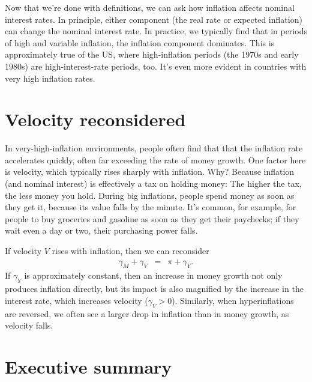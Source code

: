 Now that we're done with definitions, we can ask how inflation
affects nominal interest rates.
In principle, either component (the real rate or expected inflation)
can change the nominal interest rate.
In practice, we typically find that in periods of
high and variable inflation,
the inflation component dominates.
This is approximately true of the US, where high-inflation periods
(the 1970s and early 1980s)
are high-interest-rate periods, too.
It's even more evident in countries with very high inflation rates.


\section{Velocity reconsidered}

In very-high-inflation environments,
people often find that that the inflation rate accelerates
quickly, often far exceeding the rate of money growth.
One factor here is velocity, which typically
rises sharply with inflation.
Why?
Because inflation (and nominal interest) is effectively a tax on holding money:
The higher the tax, the less money you hold.
During big inflations,
people spend money as soon as they get it, because its
value falls by the minute.
It's common, for example, for people to buy groceries
and gasoline as soon as they get their paychecks;
if they wait even a day or two, their purchasing power falls.

If velocity $V$ rises with inflation, then we can reconsider
\begin{eqnarray}
    \gamma_M + \gamma_V  &=&  \pi + \gamma_Y .
\end{eqnarray}
If $\gamma_Y$ is approximately constant,
then an increase in money growth not only
produces inflation directly, but
its impact is also magnified by the increase in the
interest rate, which increases velocity ($\gamma_V > 0$).
Similarly, when hyperinflations are reversed,
we often see a larger drop in inflation
than in money growth, as velocity falls.


\section*{Executive summary}

